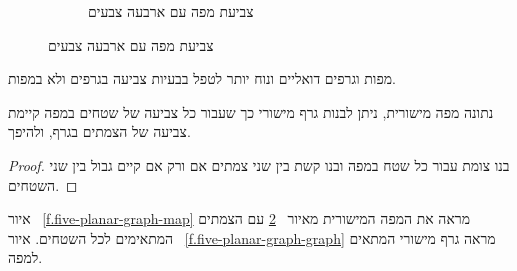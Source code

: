 \begin{figure}[tb]
\begin{center}
\begin{subfigure}{.4\textwidth}
\caption{צביעת מפה עם ארבעה צבעים}\label{f.five-planar-map-four}
\end{subfigure}
\end{center}
\end{figure}
מפות וגרפים דואליים ונוח יותר לטפל בבעיות צביעה בגרפים ולא במפות.
\begin{theorem}
נתונה מפה מישורית, ניתן לבנות גרף מישורי כך שעבור כל צביעה של שטחים במפה קיימת צביעה של הצמתים בגרף, ולהיפך.
\end{theorem}

\begin{proof}
בנו צומת עבור כל שטח במפה ובנו קשת בין שני צמתים אם ורק אם קיים גבול בין שני השטחים.
\end{proof}
\begin{example}
איור%
~\ref{f.five-planar-graph-map}
מראה את המפה המישורית מאיור%
~\ref{f.five-planar-map-four}
עם הצמתים המתאימים לכל השטחים. איור%
~\ref{f.five-planar-graph-graph}
מראה גרף מישורי המתאים למפה.
\end{example}

